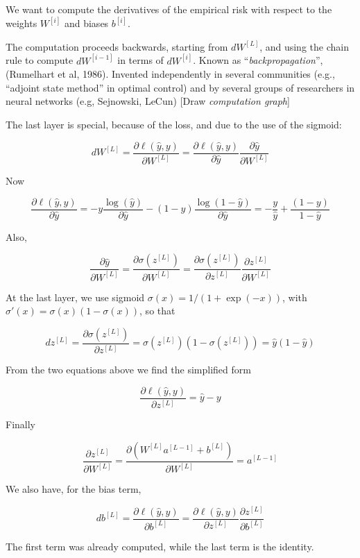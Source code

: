\documentclass[english]{article}
\begin{document}
We want to compute the derivatives of the empirical risk with respect to the weights $W^{[i]}$ and biases $b^{[i]}$. 

The computation proceeds backwards, starting from $dW^{[L]}$, and using the chain rule to compute $dW^{[i-1]}$ in terms of $dW^{[i]}$. Known as ``\emph{backpropagation}'',  (Rumelhart et al, 1986). Invented independently in several communities (e.g., ``adjoint state method'' in optimal control) and by several groups of researchers in neural networks (e.g, Sejnowski, LeCun) [Draw \emph{computation graph}]

\benum 
\item 
The last layer is special, because of the loss, and due to the use of the sigmoid: 

$$d W^{[L]} = \frac{\partial \ell(\hat y, y)}{\partial  W^{[L]}} = \frac{\partial \ell(\hat y, y)}{\partial  \hat y} \frac{\partial \hat y}{\partial  W^{[L]}}$$

Now 

$$\frac{\partial \ell(\hat y, y)}{\partial  \hat y} 
= - y\frac{ \log(\hat y)}{\partial  \hat y} - (1-y) \frac{ \log(1-\hat y)}{\partial  \hat y} 
= - \frac{y}{\hat y} + \frac{(1-y)}{1-  \hat y}$$

Also,

$$\frac{\partial \hat y}{\partial  W^{[L]}} 
=  \frac{\partial \sigma(z^{[L]})}{\partial  W^{[L]}} 
= \frac{\partial \sigma(z^{[L]})}{\partial  z^{[L]}}  \frac{\partial z^{[L]}}{\partial  W^{[L]}} $$

At the last layer, we use sigmoid $\sigma(x) = 1/(1+\exp(-x))$, with $\sigma'(x) = \sigma(x) (1-\sigma(x))$, so that 

$$dz^{[L]}= \frac{\partial \sigma(z^{[L]})}{\partial  z^{[L]}} =  \sigma(z^{[L]})(1-\sigma(z^{[L]})) = \hat y (1-\hat y)$$

From the two equations above we find the simplified form

$$\frac{\partial \ell(\hat y, y)}{\partial  z^{[L]}} = \hat y - y$$


Finally

$$ \frac{\partial z^{[L]}}{\partial  W^{[L]}} = \frac{\partial (W^{[L]} a^{[L-1]}+b^{[L]})}{\partial  W^{[L]}} = a^{[L-1]}$$


We also have, for the bias term, 

$$d b^{[L]} 
= \frac{\partial \ell(\hat y, y)}{\partial  b^{[L]}} 
= \frac{\partial \ell(\hat y, y)}{\partial  z^{[L]}}  \frac{\partial z^{[L]}}{\partial  b^{[L]}} $$

The first term was already computed, while the last term is the identity. 
\end{document}
